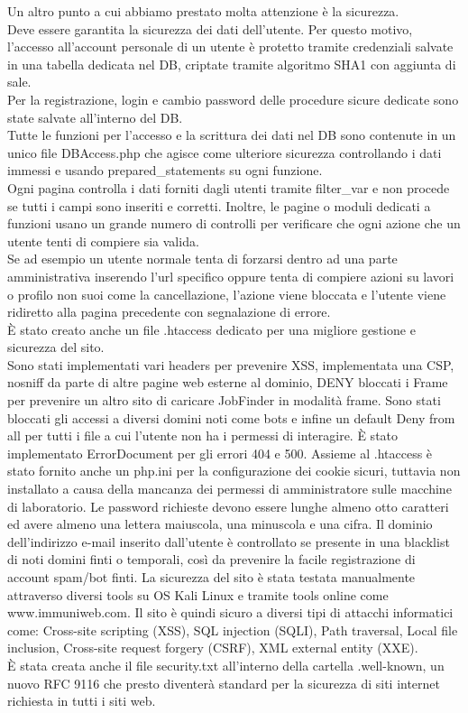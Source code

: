   Un altro punto a cui abbiamo prestato molta attenzione è la sicurezza. \\
  Deve essere garantita la sicurezza dei dati dell'utente. Per questo motivo, l’accesso all’account personale di un utente è protetto tramite credenziali salvate in una tabella dedicata nel DB, criptate tramite algoritmo SHA1 con aggiunta di sale. \\
  Per la registrazione, login e cambio password delle procedure sicure dedicate sono state salvate all’interno del DB. \\
  Tutte le funzioni per l’accesso e la scrittura dei dati nel DB sono contenute in un unico file DBAccess.php che agisce come ulteriore sicurezza controllando i dati immessi e usando prepared\_statements su ogni funzione. \\
  Ogni pagina controlla i dati forniti dagli utenti tramite filter\_var e non procede se tutti i campi sono inseriti e corretti. Inoltre, le pagine o moduli dedicati a funzioni usano un grande numero di controlli per verificare che ogni azione che un utente tenti di compiere sia valida. \\
  Se ad esempio un utente normale tenta di forzarsi dentro ad una parte amministrativa inserendo l’url specifico oppure tenta di compiere azioni su lavori o profilo non suoi come la cancellazione, l’azione viene bloccata e l’utente viene ridiretto alla pagina precedente con segnalazione di errore. \\
  È stato creato anche un file .htaccess dedicato per una migliore gestione e sicurezza del sito. \\
  Sono stati implementati vari headers per prevenire XSS, implementata una CSP, nosniff da parte di altre pagine web esterne al dominio, DENY bloccati i Frame per prevenire un altro sito di caricare JobFinder in modalità frame. Sono stati bloccati gli accessi a diversi domini noti come bots e infine un default Deny from all per tutti i file a cui l’utente non ha i permessi di interagire.
  È stato implementato ErrorDocument per gli errori 404 e 500. 
  Assieme al .htaccess è stato fornito anche un php.ini per la configurazione dei cookie sicuri, tuttavia non installato a causa della mancanza dei permessi di amministratore sulle macchine di laboratorio. Le password richieste devono essere lunghe almeno otto caratteri ed avere almeno una lettera maiuscola, una minuscola e una cifra. Il dominio dell’indirizzo e-mail inserito dall’utente è controllato se presente in una blacklist di noti domini finti o temporali, così da prevenire la facile registrazione di account spam/bot finti. La sicurezza del sito è stata testata manualmente attraverso diversi tools su OS Kali Linux e tramite tools online come www.immuniweb.com. 
  Il sito è quindi sicuro a diversi tipi di attacchi informatici come: Cross-site scripting (XSS), SQL injection (SQLI), Path traversal, Local file inclusion, Cross-site request forgery (CSRF),  XML external entity (XXE). \\
  È stata creata anche il file security.txt all’interno della cartella .well-known, un nuovo RFC 9116 che presto diventerà standard per la sicurezza di siti internet richiesta in tutti i siti web.
